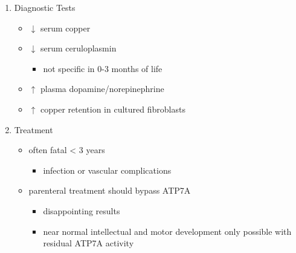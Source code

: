 \documentclass{scrartcl}
\begin{document}
\begin{enumerate}
\item Diagnostic Tests
\label{sec:orgb8521f1}
\begin{itemize}
\item \(\downarrow\) serum copper
\item \(\downarrow\) serum ceruloplasmin 
\begin{itemize}
\item not specific in 0-3 months of life
\end{itemize}
\item \(\uparrow\) plasma dopamine/norepinephrine
\item \(\uparrow\) copper retention in cultured fibroblasts
\end{itemize}

\item Treatment
\label{sec:org4f0e0fd}
\begin{itemize}
\item often fatal < 3 years
\begin{itemize}
\item infection or vascular complications
\end{itemize}
\item parenteral treatment should bypass ATP7A
\begin{itemize}
\item disappointing results
\item near normal intellectual and motor development only possible with
residual ATP7A activity
\end{itemize}
\end{itemize}
\end{enumerate}
\end{document}
